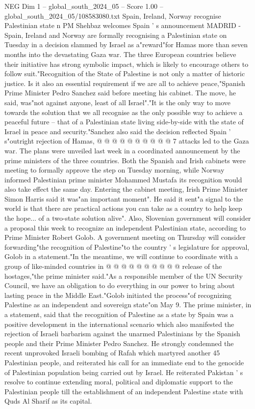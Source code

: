 \begin{textsample}{NEG Dim 1 – global\_south\_2024\_05 – Score 1.00 – global\_south\_2024\_05/108583080.txt}  \label{ex:f1_neg_209}
Spain, Ireland, Norway recognise Palestinian state n PM Shehbaz welcomes Spain ' s announcement MADRID - Spain, Ireland and Norway are formally recognising a Palestinian state on Tuesday in a decision slammed by Israel as a"reward"for Hamas more than seven months into the devastating Gaza war.
The three European countries believe their initiative has strong symbolic impact, which is likely to encourage others to follow suit."Recognition of the State of Palestine is not only a matter of historic justice.
Is it also an essential requirement if we are all to achieve peace,"Spanish Prime Minister Pedro Sanchez said before meeting his cabinet.
The move, he said, was"not against anyone, least of all Israel"."It is the only way to move towards the solution that we all recognise as the only possible way to achieve a peaceful future -- that of a Palestinian state living side-by-side with the state of Israel in peace and security."Sanchez also said the decision reflected Spain ' s"outright rejection of Hamas, @ @ @ @ @ @ @ @ @ @ 7 attacks led to the Gaza war.
The plans were unveiled last week in a coordinated announcement by the prime ministers of the three countries.
Both the Spanish and Irish cabinets were meeting to formally approve the step on Tuesday morning, while Norway informed Palestinian prime minister Mohammed Mustafa its recognition would also take effect the same day.
Entering the cabinet meeting, Irish Prime Minister Simon Harris said it was"an important moment".
He said it sent"a signal to the world is that there are practical actions you can take as a country to help keep the hope... of a two-state solution alive".
Also, Slovenian government will consider a proposal this week to recognize an independent Palestinian state, according to Prime Minister Robert Golob.
A government meeting on Thursday will consider forwarding"the recognition of Palestine"to the country ' s legislature for approval, Golob in a statement."In the meantime, we will continue to coordinate with a group of like-minded countries in @ @ @ @ @ @ @ @ @ @ release of the hostages,"the prime minister said."As a responsible member of the UN Security Council, we have an obligation to do everything in our power to bring about lasting peace in the Middle East."Golob initiated the process"of recognizing Palestine as an independent and sovereign state"on May 9.
The prime minister, in a statement, said that the recognition of Palestine as a state by Spain was a positive development in the international scenario which also manifested the rejection of Israeli barbarism against the unarmed Palestinians by the Spanish people and their Prime Minister Pedro Sanchez.
He strongly condemned the recent unprovoked Israeli bombing of Rafah which martyred another 45 Palestinian people, and reiterated his call for an immediate end to the genocide of Palestinian population being carried out by Israel.
He reiterated Pakistan ' s resolve to continue extending moral, political and diplomatic support to the Palestinian people till the establishment of an independent Palestine state with Quds Al Sharif as its capital.

\end{textsample}
